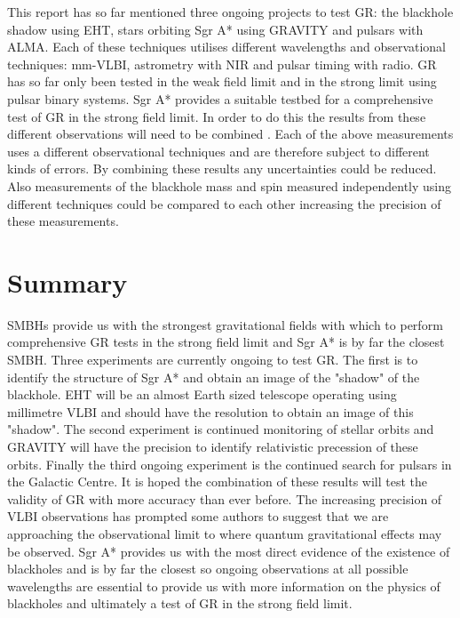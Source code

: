 \documentclass[a4paper,12pt]{article}
\begin{document}
This report has so far mentioned three ongoing projects to test GR: the blackhole shadow using EHT, stars orbiting Sgr A* using GRAVITY and pulsars with ALMA. Each of these techniques utilises
different wavelengths and observational techniques: mm-VLBI, astrometry with NIR and pulsar timing with radio.
GR has so far only been tested in the weak field limit and in the strong limit using pulsar binary systems. Sgr A* provides a suitable testbed for a comprehensive test of GR in the strong field limit. 
In order to do this the results from these
different observations will need to be combined \citep{goddi}. Each of the above measurements uses a different observational techniques and are therefore subject to different kinds of errors. By 
combining these results any uncertainties could be reduced. Also measurements of the blackhole mass and spin measured independently using different techniques could be compared to each other 
increasing the precision of these measurements.

\section{Summary}
SMBHs provide us with the strongest gravitational fields with which to perform comprehensive GR tests in the strong field limit and Sgr A* is by far the closest SMBH. Three experiments are currently
ongoing to test GR. The first is to identify the structure of Sgr A* and obtain an image of the "shadow" of the blackhole. EHT will be an almost Earth sized telescope operating using millimetre VLBI
and should have the resolution to obtain an image of this "shadow". The second experiment is continued monitoring of stellar orbits and GRAVITY will have the precision to identify relativistic 
precession of these orbits. Finally the third ongoing experiment is the continued search for pulsars in the Galactic Centre. It is hoped the combination of these results will test the validity of 
GR with
more accuracy than ever before. The increasing precision of VLBI observations has prompted some authors \citep{haggard} to suggest that we are approaching the observational limit to where quantum 
gravitational effects may be observed. Sgr A* provides us with the most direct evidence of the existence of blackholes and is by far the closest so ongoing observations at all possible wavelengths are
essential to provide us with more information on the physics of blackholes and ultimately a test of GR in the strong field limit.
\end{document}
